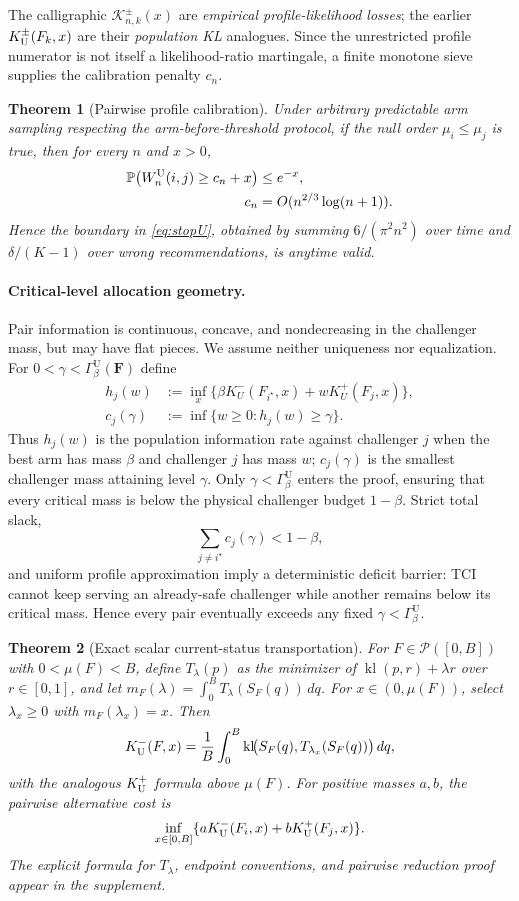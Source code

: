 \documentclass[twoside]{article}
\newtheorem{theorem}{Theorem}
\theoremstyle{definition}
\newcommand{\Pp}{\mathbb P}
\newcommand{\kl}{\operatorname{kl}}
\newcommand{\1}{\mathbf 1}
\newcommand{\cP}{\mathcal P}
\newcommand{\GammaU}{\Gamma_{\beta}^{\mathrm U}}
\begin{document}
The calligraphic $\mathcal K_{n,k}^\pm(x)$ are \emph{empirical
profile-likelihood losses}; the earlier $K_{\rm U}^\pm(F_k,x)$ are their
\emph{population KL} analogues. Since the unrestricted profile numerator is
not itself a likelihood-ratio martingale, a finite monotone sieve supplies the
calibration penalty $c_n$.
\begin{theorem}[Pairwise profile calibration]
\label{thm:Ucal}
Under arbitrary predictable arm sampling respecting the arm-before-threshold
protocol, if the null order $\mu_i\le\mu_j$ is true, then for every $n$ and $x>0$,
\begin{align*}
\Pp\!\left(W_n^{\rm U}(i,j)\ge c_n+x\right)&\le e^{-x},\\
c_n&=O(n^{2/3}\log(n+1)).
\end{align*}
Hence the boundary in \eqref{eq:stopU}, obtained by summing $6/(\pi^2n^2)$ over time and $\delta/(K-1)$ over wrong recommendations, is anytime valid.
\end{theorem}

\paragraph{Critical-level allocation geometry.}
Pair information is continuous, concave, and nondecreasing in the
challenger mass, but may have flat pieces. We assume neither uniqueness
nor equalization.  For $0<\gamma<\GammaU(\mathbf F)$ define
\begin{align*}
h_j(w)
&:=\inf_x\{
\beta K_U^-(F_{i^\star},x)
+wK_U^+(F_j,x)\},\\
c_j(\gamma)
&:=\inf\{w\ge0:h_j(w)\ge\gamma\}.
\end{align*}
Thus $h_j(w)$ is the population information rate against challenger $j$
when the best arm has mass $\beta$ and challenger $j$ has mass $w$;
$c_j(\gamma)$ is the smallest challenger mass attaining level $\gamma$.
Only $\gamma<\GammaU$ enters the proof, ensuring that every critical mass
is below the physical challenger budget $1-\beta$. Strict total
slack,
\[
\sum_{j\ne i^\star}c_j(\gamma)<1-\beta,
\]
and uniform profile approximation imply a deterministic deficit barrier:
TCI cannot keep serving an already-safe challenger while another remains
below its critical mass.  Hence every pair eventually exceeds any fixed
$\gamma<\GammaU$.

\begin{theorem}[Exact scalar current-status transportation]
\label{thm:Uscalar}
For $F\in\cP([0,B])$ with $0<\mu(F)<B$, define
$T_\lambda(p)$ as the minimizer of $\kl(p,r)+\lambda r$ over
$r\in[0,1]$, and let $m_F(\lambda)=\int_0^B
T_\lambda(S_F(q))\,dq$.
For $x\in(0,\mu(F))$, select $\lambda_x\ge0$ with
$m_F(\lambda_x)=x$. Then
\begin{equation}
K_{\rm U}^-(F,x)=\frac1B\int_0^B
 \kl\!\bigl(S_F(q),T_{\lambda_x}(S_F(q))\bigr)\,dq,
\label{eq:Uscalar-compact}
\end{equation}
with the analogous $K_{\rm U}^+$ formula above $\mu(F)$.
For positive masses $a,b$, the pairwise alternative cost is
\[
\inf_{x\in[0,B]}\{aK_{\rm U}^-(F_i,x)+bK_{\rm U}^+(F_j,x)\}.
\]
The explicit formula for $T_\lambda$, endpoint conventions, and
pairwise reduction proof appear in the supplement.
\end{theorem}
\end{document}
